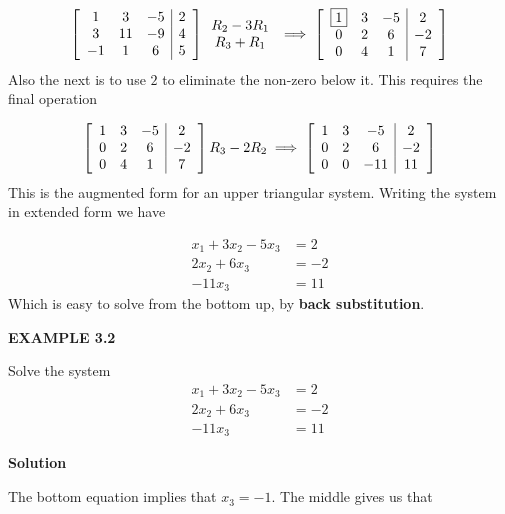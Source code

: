 \documentclass[a4paper, 12pt]{report}
\begin{document}
{     \[
     \left[ \begin{array}{c c c |c}
     1& 3& -5& 2\\
     3& 11& -9& 4\\
     -1& 1& 6& 5
     \end{array} \right]
     \begin{array}{c} R_2-3R_1\\ R_3+R_1 \end{array}\implies
     \left[ \begin{array}{c c c |c}
     \boxed{1}& 3& -5& 2\\
     0& 2& 6& -2\\
     0& 4& 1& 7
     \end{array} \right]
     \]
     Also the next is to use $\boxed{2}$ to eliminate the non-zero below it. This requires the final operation
     
     \[
     \left[ \begin{array}{c c c |c}
     1& 3& -5& 2\\
     0& 2& 6& -2\\
     0& 4& 1& 7
     \end{array} \right]
     R_3-2R_2 \implies
     \left[ \begin{array}{c c c |c}
     1& 3& -5& 2\\
     0& 2& 6& -2\\
     0& 0& -11& 11
     \end{array} \right]
     \]
     This is the augmented form for an upper triangular system. Writing the system in extended form we have
     
     \begin{align*}
     x_1+3x_2-5x_3&=2\\
     2x_2+6x_3&=-2\\
     -11x_3&=11
     \end{align*}
     Which is easy to solve from the bottom up, by \textbf{back substitution}.
     \\
     \begin{center}
     	\textbf{EXAMPLE 3.2}
     \end{center}
      Solve the system  
     \begin{align}
     x_1+3x_2-5x_3&=2\\
     2x_2+6x_3&=-2\\
     -11x_3&=11
     \end{align}
     \begin{center}
     	\textbf{Solution}
     \end{center}
     The bottom equation implies that $x_3=-1$. The middle gives us that
     
}
\end{document}
